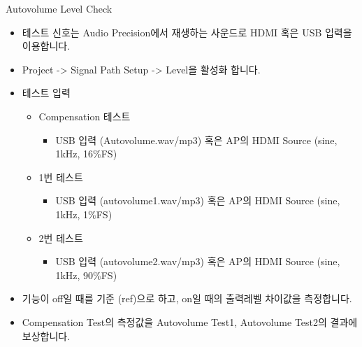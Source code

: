 \documentclass{beamer}
\begin{document}
\begin{frame}[t]{Autovolume Level Check}
\begin{itemize}
\item 테스트 신호는 Audio Precision에서 재생하는 사운드로 HDMI 혹은 USB 입력을 이용합니다.
\item Project -> Signal Path Setup -> Level을 활성화 합니다.
\item 테스트 입력
	\begin{itemize}
	\item Compensation 테스트
		\begin{itemize}
		\item USB 입력 (Autovolume.wav/mp3) 혹은 AP의 HDMI Source (sine, 1kHz, 16\%FS)
		\end{itemize}
	\item 1번 테스트
		\begin{itemize}
		\item USB 입력 (autovolume1.wav/mp3) 혹은 AP의 HDMI Source (sine, 1kHz, 1\%FS)
		\end{itemize}
	\item 2번 테스트
		\begin{itemize}
		\item USB 입력 (autovolume2.wav/mp3) 혹은 AP의 HDMI Source (sine, 1kHz, 90\%FS)
		\end{itemize}
	\end{itemize}
\item 기능이 off일 때를 기준 (ref)으로 하고, on일 때의 출력레벨 차이값을 측정합니다.
\item Compensation Test의 측정값을 Autovolume Test1, Autovolume Test2의 결과에 보상합니다.
\end{itemize}
\end{frame}
\end{document}
